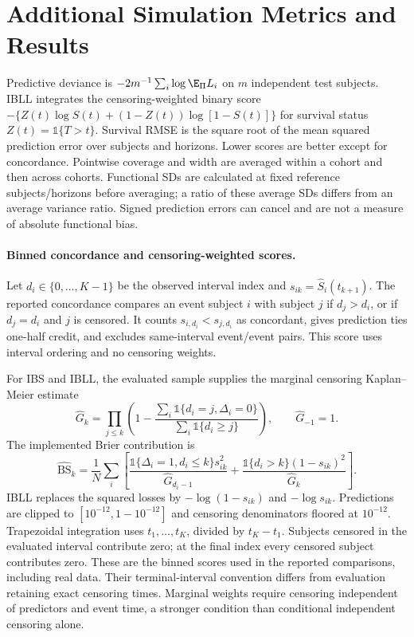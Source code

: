 \documentclass{article} %
\begin{document}
\section{Additional Simulation Metrics and Results}
\label{app:simulation-metrics}
Predictive deviance is $-2m^{-1}\sum_i\log\E_\Pi L_i$ on $m$ independent test subjects. IBLL integrates the censoring-weighted binary score $-\{Z(t)\log S(t)+(1-Z(t))\log[1-S(t)]\}$ for survival status $Z(t)=\mathbb 1\{T>t\}$. Survival RMSE is the square root of the mean squared prediction error over subjects and horizons. Lower scores are better except for concordance. Pointwise coverage and width are averaged within a cohort and then across cohorts. Functional SDs are calculated at fixed reference subjects/horizons before averaging; a ratio of these average SDs differs from an average variance ratio. Signed prediction errors can cancel and are not a measure of absolute functional bias.

\paragraph{Binned concordance and censoring-weighted scores.}
Let $d_i\in\{0,\ldots,K-1\}$ be the observed interval index and $s_{ik}=\widehat S_i(t_{k+1})$. The reported concordance compares an event subject $i$ with subject $j$ if $d_j>d_i$, or if $d_j=d_i$ and $j$ is censored. It counts $s_{i,d_i}<s_{j,d_i}$ as concordant, gives prediction ties one-half credit, and excludes same-interval event/event pairs. This score uses interval ordering and no censoring weights.

For IBS and IBLL, the evaluated sample supplies the marginal censoring Kaplan--Meier estimate
\[
\widehat G_k=\prod_{j\le k}\left(1-\frac{\sum_i\mathbb 1\{d_i=j,\Delta_i=0\}}{\sum_i\mathbb 1\{d_i\ge j\}}\right),\qquad \widehat G_{-1}=1.
\]
The implemented Brier contribution is
\[
\widehat{\mathrm{BS}}_k=\frac1N\sum_i\left[
\frac{\mathbb 1\{\Delta_i=1,d_i\le k\}s_{ik}^2}{\widehat G_{d_i-1}}
+\frac{\mathbb 1\{d_i>k\}(1-s_{ik})^2}{\widehat G_k}\right].
\]
IBLL replaces the squared losses by $-\log(1-s_{ik})$ and $-\log s_{ik}$. Predictions are clipped to $[10^{-12},1-10^{-12}]$ and censoring denominators floored at $10^{-12}$. Trapezoidal integration uses $t_1,\ldots,t_K$, divided by $t_K-t_1$. Subjects censored in the evaluated interval contribute zero; at the final index every censored subject contributes zero. These are the binned scores used in the reported comparisons, including real data. Their terminal-interval convention differs from evaluation retaining exact censoring times. Marginal weights require censoring independent of predictors and event time, a stronger condition than conditional independent censoring alone.
\end{document}
